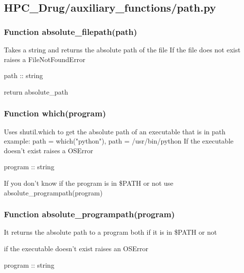 

\subsection{HPC\_Drug/auxiliary\_functions/path.py}

    \subsubsection{Function absolute\_filepath(path)}
    
        Takes a string and returns the absolute path of the file
        If the file does not exist raises a FileNotFoundError

        path :: string

        return absolute\_path

    \subsubsection{Function which(program)}

        Uses shutil.which to get the absolute path of an executable that is in path
        example: path = which("python"), path = /usr/bin/python
        If the executable doesn't exist raises a OSError

        program :: string

        If you don't know if the program is in \$PATH or not use absolute\_programpath(program)

    \subsubsection{Function absolute\_programpath(program)}
    
        It returns the absolute path to a program both if it is in \$PATH or not

        if the executable doesn't exist raises an OSError

        program :: string